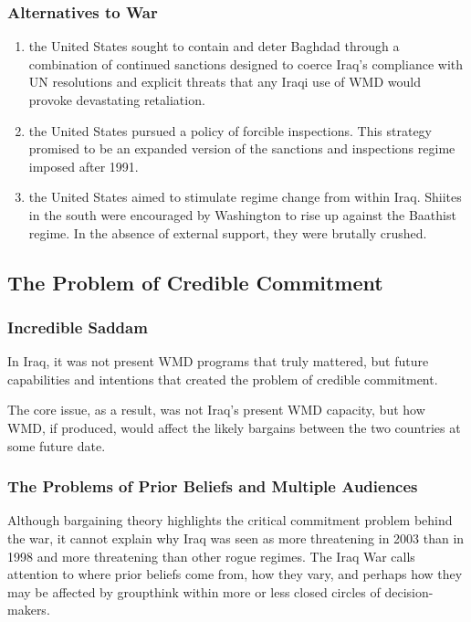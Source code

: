 \subsubsection{Alternatives to War}
\begin{enumerate}
    \item the United States sought to contain and deter Baghdad through a combination of continued sanctions designed to coerce Iraq's compliance with UN resolutions and explicit threats that any Iraqi use of WMD would provoke devastating retaliation.

    \item the United States pursued a policy of forcible inspections. This strategy promised to be an expanded version of the sanctions and inspections regime imposed after 1991.

    \item the United States aimed to stimulate regime change from within Iraq. Shiites in the south were encouraged by Washington to rise up against the Baathist regime. In the absence of external support, they were brutally crushed.
\end{enumerate}

\subsection{The Problem of Credible Commitment}
\subsubsection{Incredible Saddam}
In Iraq, it was not present WMD programs that truly mattered, but future capabilities and intentions that created the problem of credible commitment.

The core issue, as a result, was not Iraq's present WMD capacity, but how WMD, if produced, would affect the likely bargains between the two countries at some future date.

\subsubsection{The Problems of Prior Beliefs and Multiple Audiences}
Although bargaining theory highlights the critical commitment problem behind the war, it cannot explain why Iraq was seen as more threatening in 2003 than in 1998 and more threatening than other rogue regimes. The Iraq War calls attention to where prior beliefs come from, how they vary, and perhaps how they may be affected by groupthink within more or less closed circles of decision-makers.


